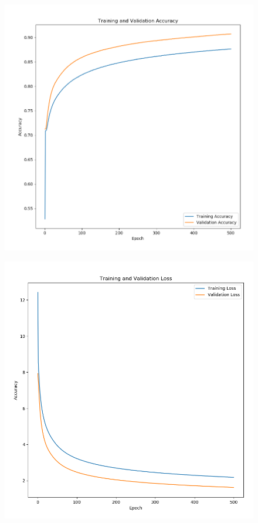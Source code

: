 \begin{figure}[H]
	\centering
	\includegraphics[scale=0.35]{./images/plot.png}
\end{figure}
\begin{figure}[H]
	\centering
	\includegraphics[scale=0.35]{./images/plot2.png}
\end{figure}

